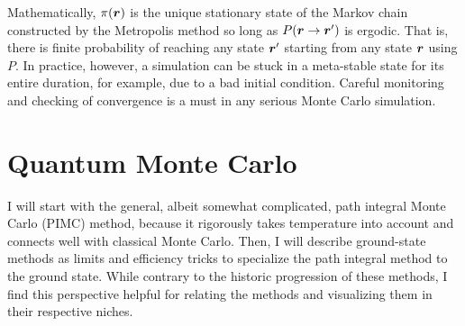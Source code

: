 Mathematically, $\pi(\boldsymbol{r})$ is the unique stationary state of the Markov chain constructed by the Metropolis method so long as $P(\boldsymbol{r}\rightarrow\boldsymbol{r}')$ is ergodic. That is, there is finite probability of reaching any state $\boldsymbol{r}'$ starting from any state $\boldsymbol{r}$ using $P$.
In practice, however, a simulation can be stuck in a meta-stable state for its entire duration, for example, due to a bad initial condition. Careful monitoring and checking of convergence is a must in any serious Monte Carlo simulation.

\section{Quantum Monte Carlo}

I will start with the general, albeit somewhat complicated, path integral Monte Carlo (PIMC) method, because it rigorously takes temperature into account and connects well with classical Monte Carlo. Then, I will describe ground-state methods as limits and efficiency tricks to specialize the path integral method to the ground state. While contrary to the historic progression of these methods, I find this perspective helpful for relating the methods and visualizing them in their respective niches.

